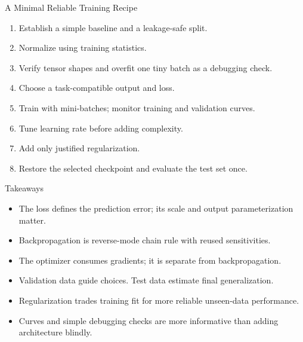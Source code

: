 \documentclass[10pt,aspectratio=169]{ntuabeamer}
\begin{document}
\begin{frame}{A Minimal Reliable Training Recipe}
  \begin{enumerate}
    \item Establish a simple baseline and a leakage-safe split.
    \item Normalize using training statistics.
    \item Verify tensor shapes and overfit one tiny batch as a debugging check.
    \item Choose a task-compatible output and loss.
    \item Train with mini-batches; monitor training and validation curves.
    \item Tune learning rate before adding complexity.
    \item Add only justified regularization.
    \item Restore the selected checkpoint and evaluate the test set once.
  \end{enumerate}
\end{frame}

\begin{frame}{Takeaways}
  \begin{itemize}
    \item The loss defines the prediction error; its scale and output parameterization matter.
    \item Backpropagation is reverse-mode chain rule with reused sensitivities.
    \item The optimizer consumes gradients; it is separate from backpropagation.
    \item Validation data guide choices. Test data estimate final generalization.
    \item Regularization trades training fit for more reliable unseen-data performance.
    \item Curves and simple debugging checks are more informative than adding architecture blindly.
  \end{itemize}
\end{frame}
\end{document}
